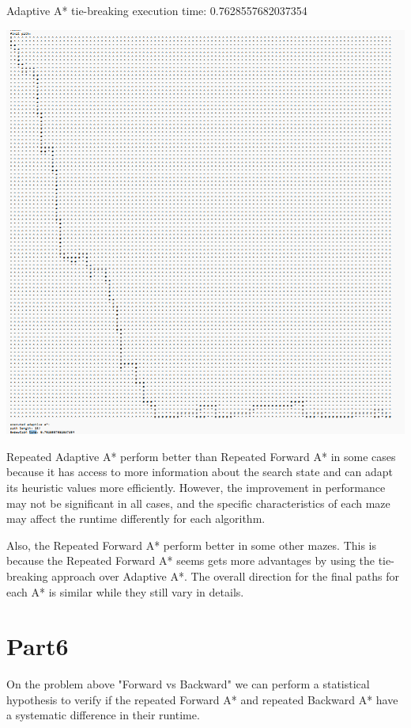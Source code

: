 \documentclass[12pt, letterpaper]{article}
\begin{document}
Adaptive A* tie-breaking execution time: 0.7628557682037354

\includegraphics[width=\textwidth,height=\textheight]{part5b.png}

Repeated Adaptive A* perform better than Repeated Forward A* in some cases because it has access to more information about the search state and can adapt its heuristic values more efficiently. However, the improvement in performance may not be significant in all cases, and the specific characteristics of each maze may affect the runtime differently for each algorithm.

Also, the Repeated Forward A* perform better in some other mazes. This is because the Repeated Forward A* seems gets more advantages by using the tie-breaking approach over Adaptive A*. The overall direction for the final paths for each A* is similar while they still vary in details. 

\section{Part6}

On the problem above "Forward vs Backward" we can perform a statistical hypothesis to verify if the repeated Forward A* and repeated Backward A* have a systematic difference in their runtime. 
\end{document}
